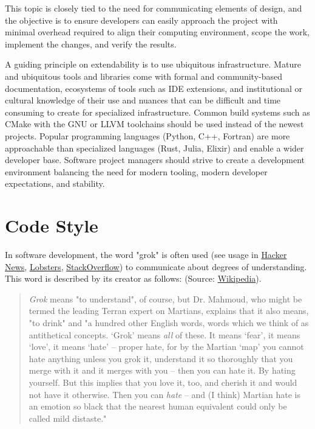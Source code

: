 \documentclass[]{nlr}
\begin{document}
This topic is closely tied to the need for communicating elements of design, and the objective is to ensure
developers can easily approach the project with minimal overhead required to align their
computing environment, scope the work, implement the changes, and verify the results.

A guiding principle on extendability is to use ubiquitous infrastructure.
Mature and ubiquitous tools and libraries come with formal and community-based documentation,
ecosystems of tools such as IDE extensions, and institutional or cultural knowledge of
their use and nuances that can be difficult and time consuming to create for specialized
infrastructure.
Common build systems such as CMake with the GNU or LLVM toolchains should be used instead of
the newest projects.
Popular programming languages (Python, C++, Fortran) are more approachable than specialized
languages (Rust, Julia, Elixir) and enable a wider developer base.
Software project managers should strive to create a development environment balancing the need for
modern tooling, modern developer expectations, and stability.

\section{Code Style}
In software development, the word "grok" is often used (see usage in
\href{https://hn.algolia.com/?q=grok}{Hacker News},
\href{https://lobste.rs/search?q=grok\&what=stories\&order=newest}{Lobsters},
\href{https://stackoverflow.com/search?tab=newest\&q=grok\&searchOn=3}{StackOverflow})
to communicate about degrees of understanding. This word is described by its creator as follows:
(Source: \href{https://en.wikipedia.org/wiki/Grok}{Wikipedia}).
\begin{quote}

\textit{Grok} means "to understand", of course, but Dr. Mahmoud, who might be termed the leading
Terran expert on Martians, explains that it also means, "to drink" and "a hundred other
English words, words which we think of as antithetical concepts. ‘Grok’ means \textit{all} of
these. It means ‘fear’, it means ‘love’, it means ‘hate’ – proper hate, for by the Martian
‘map’ you cannot hate anything unless you grok it, understand it so thoroughly that you
merge with it and it merges with you – then you can hate it. By hating yourself. But this
implies that you love it, too, and cherish it and would not have it otherwise. Then you
can \textit{hate} – and (I think) Martian hate is an emotion so black that the nearest human
equivalent could only be called mild distaste."
\end{quote}
\end{document}
